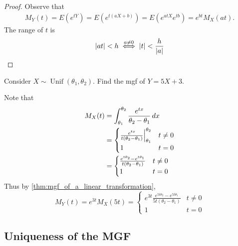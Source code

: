 \documentclass[notoc,notitlepage]{tufte-book}
\DeclareMathOperator{\Unif}{Unif }
\begin{document}
\begin{proof}
  Observe that
  \begin{align*}
    M_Y(t) = E(e^{tY}) = E(e^{t(aX + b)}) = E(e^{atX}e^{tb}) = e^{bt} M_X(at).
  \end{align*}
  The range of $t$ is
  \begin{equation*}
    \left|at\right| < h \overset{a \neq 0}{\iff} \left|t\right| < \frac{h}{\left|a\right|}
  \end{equation*}
\end{proof}

\begin{eg}[Example 2.28]
  Consider $X \sim \Unif(\theta_1, \theta_2)$. Find the mgf of $Y = 5X + 3$.

  \begin{solution}
    Note that
    \begin{align*}
      M_X(t) &= \int_{\theta_1}^{\theta_2} \frac{e^{tx}}{\theta_2 - \theta_1} \mathop{}\!d{x} \\
        &= \begin{cases}
          \frac{e^{tx}}{t ( \theta_2 - \theta_1 )} \Big|_{\theta_1}^{\theta_2} & t \neq 0 \\
          1 & t = 0
        \end{cases} \\
        &= \begin{cases}
          \frac{e^{t \theta_2} - e^{t \theta_1}}{t (\theta_2 - \theta_1)} & t \neq 0 \\
          1 & t = 0
        \end{cases}
    \end{align*}
    Thus by \cref{thm:mgf_of_a_linear_transformation},
    \begin{equation*}
      M_Y(t) = e^{3t} M_X(5t) = \begin{cases}
        e^{3t} \frac{e^{5t \theta_2} - e^{5t \theta_1}}{5t (\theta_2 - \theta_1)} & t \neq 0 \\
        1 & t = 0
      \end{cases}
    \end{equation*}
  \end{solution}
\end{eg}


\subsection{Uniqueness of the MGF}
\label{sub:uniqueness_of_the_mgf}
\end{document}
